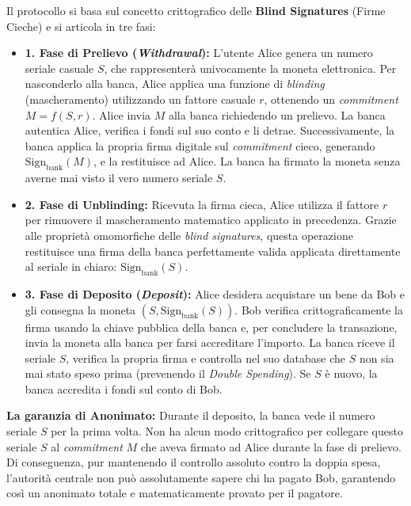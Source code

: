 Il protocollo si basa sul concetto crittografico delle \textbf{Blind Signatures} (Firme Cieche) e si articola in tre fasi:

\begin{itemize}
    \item \textbf{1. Fase di Prelievo (\textit{Withdrawal}):} L'utente Alice genera un numero seriale casuale $S$, che rappresenterà univocamente la moneta elettronica. Per nasconderlo alla banca, Alice applica una funzione di \textit{blinding} (mascheramento) utilizzando un fattore casuale $r$, ottenendo un \textit{commitment} $M = f(S, r)$. Alice invia $M$ alla banca richiedendo un prelievo.
    La banca autentica Alice, verifica i fondi sul suo conto e li detrae. Successivamente, la banca applica la propria firma digitale sul \textit{commitment} cieco, generando $\text{Sign}_{\text{bank}}(M)$, e la restituisce ad Alice. La banca ha firmato la moneta senza averne mai visto il vero numero seriale $S$.
    
    \item \textbf{2. Fase di Unblinding:} Ricevuta la firma cieca, Alice utilizza il fattore $r$ per rimuovere il mascheramento matematico applicato in precedenza. Grazie alle proprietà omomorfiche delle \textit{blind signatures}, questa operazione restituisce una firma della banca perfettamente valida applicata direttamente al seriale in chiaro: $\text{Sign}_{\text{bank}}(S)$.
    
    \item \textbf{3. Fase di Deposito (\textit{Deposit}):} Alice desidera acquistare un bene da Bob e gli consegna la moneta $(S, \text{Sign}_{\text{bank}}(S))$. Bob verifica crittograficamente la firma usando la chiave pubblica della banca e, per concludere la transazione, invia la moneta alla banca per farsi accreditare l'importo. La banca riceve il seriale $S$, verifica la propria firma e controlla nel suo database che $S$ non sia mai stato speso prima (prevenendo il \textit{Double Spending}). Se $S$ è nuovo, la banca accredita i fondi sul conto di Bob.
\end{itemize}

\textbf{La garanzia di Anonimato:} Durante il deposito, la banca vede il numero seriale $S$ per la prima volta. Non ha alcun modo crittografico per collegare questo seriale $S$ al \textit{commitment} $M$ che aveva firmato ad Alice durante la fase di prelievo. Di conseguenza, pur mantenendo il controllo assoluto contro la doppia spesa, l'autorità centrale non può assolutamente sapere chi ha pagato Bob, garantendo così un anonimato totale e matematicamente provato per il pagatore.

